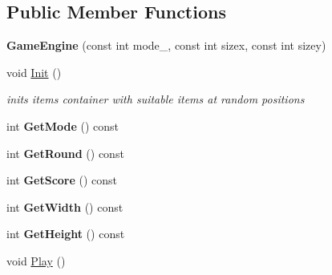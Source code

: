 \subsection*{Public Member Functions}
\begin{DoxyCompactItemize}
\item 
{\bfseries Game\+Engine} (const int mode\+\_\+, const int sizex, const int sizey)\hypertarget{class_game_engine_afce908a69590e1fbbf5e6c142d8817db}{}\label{class_game_engine_afce908a69590e1fbbf5e6c142d8817db}

\item 
void \hyperlink{class_game_engine_ab7daf2551eca113947559e9f07dae0a7}{Init} ()\hypertarget{class_game_engine_ab7daf2551eca113947559e9f07dae0a7}{}\label{class_game_engine_ab7daf2551eca113947559e9f07dae0a7}

\begin{DoxyCompactList}\small\item\em inits items container with suitable items at random positions \end{DoxyCompactList}\item 
int {\bfseries Get\+Mode} () const \hypertarget{class_game_engine_a7654f7e7c36f08ca30d7ab787b6c8395}{}\label{class_game_engine_a7654f7e7c36f08ca30d7ab787b6c8395}

\item 
int {\bfseries Get\+Round} () const \hypertarget{class_game_engine_a70dbb4a628af69ee9a98bcd0f55cf82b}{}\label{class_game_engine_a70dbb4a628af69ee9a98bcd0f55cf82b}

\item 
int {\bfseries Get\+Score} () const \hypertarget{class_game_engine_aaadf240e3c57133232fbc76a6c7dbef4}{}\label{class_game_engine_aaadf240e3c57133232fbc76a6c7dbef4}

\item 
int {\bfseries Get\+Width} () const \hypertarget{class_game_engine_a8ebfb1997f8ba5e7883eaa5f6dcf07b0}{}\label{class_game_engine_a8ebfb1997f8ba5e7883eaa5f6dcf07b0}

\item 
int {\bfseries Get\+Height} () const \hypertarget{class_game_engine_a6d8b90505d78fed818a60359ece85365}{}\label{class_game_engine_a6d8b90505d78fed818a60359ece85365}

\item 
void \hyperlink{class_game_engine_aafb70dae41903a73df76f638541665f8}{Play} ()\hypertarget{class_game_engine_aafb70dae41903a73df76f638541665f8}{}\label{class_game_engine_aafb70dae41903a73df76f638541665f8}


\end{DoxyCompactItemize}
